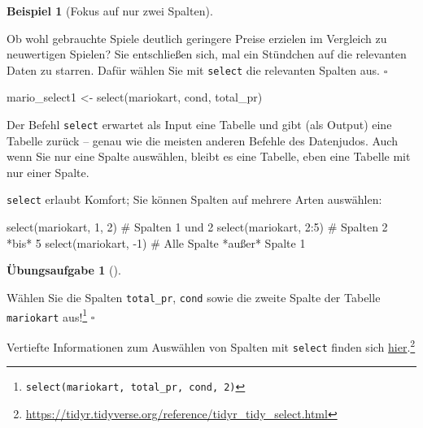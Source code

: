 \documentclass[
  letterpaper,
  twoside,
  open=any]{scrbook}
\newenvironment{Shaded}{\begin{snugshade}}{\end{snugshade}}
\newcommand{\CommentTok}[1]{\textcolor[rgb]{0.37,0.37,0.37}{#1}}
\newcommand{\DecValTok}[1]{\textcolor[rgb]{0.68,0.00,0.00}{#1}}
\newcommand{\FunctionTok}[1]{\textcolor[rgb]{0.28,0.35,0.67}{#1}}
\newcommand{\NormalTok}[1]{\textcolor[rgb]{0.00,0.23,0.31}{#1}}
\newcommand{\OtherTok}[1]{\textcolor[rgb]{0.00,0.23,0.31}{#1}}
\newcommand{\SpecialCharTok}[1]{\textcolor[rgb]{0.37,0.37,0.37}{#1}}
\theoremstyle{definition}
\theoremstyle{definition}
\newtheorem{exercise}{Übungsaufgabe}[chapter]
\theoremstyle{definition}
\newtheorem{example}{Beispiel}[chapter]
\theoremstyle{remark}
\begin{document}
\begin{example}[Fokus auf nur zwei
Spalten]\protect\hypertarget{exm-select}{}\label{exm-select}

Ob wohl gebrauchte Spiele deutlich geringere Preise erzielen im
Vergleich zu neuwertigen Spielen? Sie entschließen sich, mal ein
Stündchen auf die relevanten Daten zu starren. Dafür wählen Sie mit
\texttt{select} die relevanten Spalten aus. \(\square\)

\end{example}

\begin{Shaded}
\begin{Highlighting}[]
\NormalTok{mario\_select1 }\OtherTok{\textless{}{-}} \FunctionTok{select}\NormalTok{(mariokart, cond, total\_pr)}
\end{Highlighting}
\end{Shaded}

Der Befehl \texttt{select} erwartet als Input eine Tabelle und gibt (als
Output) eine Tabelle zurück -- genau wie die meisten anderen Befehle des
Datenjudos. Auch wenn Sie nur eine Spalte auswählen, bleibt es eine
Tabelle, eben eine Tabelle mit nur einer Spalte.

\texttt{select} erlaubt Komfort; Sie können Spalten auf mehrere Arten
auswählen:

\begin{Shaded}
\begin{Highlighting}[]
\FunctionTok{select}\NormalTok{(mariokart, }\DecValTok{1}\NormalTok{, }\DecValTok{2}\NormalTok{)  }\CommentTok{\# Spalten 1 und 2}
\FunctionTok{select}\NormalTok{(mariokart, }\DecValTok{2}\SpecialCharTok{:}\DecValTok{5}\NormalTok{)  }\CommentTok{\#  Spalten 2 *bis* 5 }
\FunctionTok{select}\NormalTok{(mariokart, }\SpecialCharTok{{-}}\DecValTok{1}\NormalTok{)  }\CommentTok{\# Alle Spalte *außer* Spalte 1}
\end{Highlighting}
\end{Shaded}

\begin{exercise}[]\protect\hypertarget{exr-select}{}\label{exr-select}

Wählen Sie die Spalten \texttt{total\_pr}, \texttt{cond} sowie die
zweite Spalte der Tabelle \texttt{mariokart} aus!\footnote{\texttt{select(mariokart,\ total\_pr,\ cond,\ 2)}}
\(\square\)

\end{exercise}

Vertiefte Informationen zum Auswählen von Spalten mit \texttt{select}
finden sich
\href{https://tidyr.tidyverse.org/reference/tidyr_tidy_select.html}{hier}.\footnote{\url{https://tidyr.tidyverse.org/reference/tidyr_tidy_select.html}}
\end{document}
